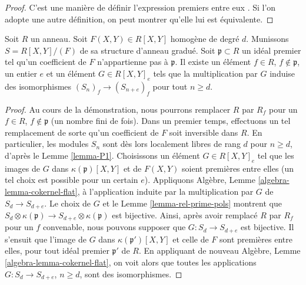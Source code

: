 \begin{proof}
C'est une mani\`ere de d\'efinir l'expression \og premiers entre eux \fg. Si
l'on adopte une autre d\'efinition, on peut montrer qu'elle lui est \'equivalente.
\end{proof}

\begin{lemma}
\label{lemma-P1-localize}
Soit $R$ un anneau. Soit $F(X, Y) \in R[X, Y]$ homog\`ene de degr\'e
$d$. Munissons $S = R[X, Y]/(F)$ de sa structure d'anneau gradu\'e.
Soit $\mathfrak p \subset R$ un id\'eal premier tel qu'un
coefficient de $F$ n'appartienne pas \`a $\mathfrak p$.
Il existe un \'el\'ement $f \in R$, $f \not\in \mathfrak p$,
un entier $e$ et un \'el\'ement $G \in R[X, Y]_e$
tels que la multiplication par $G$ induise des isomorphismes
$(S_n)_f \to (S_{n + e})_f$ pour tout $n \geq d$.
\end{lemma}

\begin{proof}
Au cours de la d\'emonstration, nous pourrons remplacer $R$ par $R_f$
pour un $f\in R$, $f\not\in \mathfrak p$ (un nombre fini de fois).
Dans un premier temps, effectuons un tel remplacement de sorte
qu'un coefficient de $F$ soit inversible dans $R$.
En particulier, les modules $S_n$ sont d\`es lors localement
libres de rang $d$ pour $n \geq d$, d'apr\`es le Lemme \ref{lemma-P1}.
Choisissons un \'el\'ement $G \in R[X, Y]_e$ tel que les images de
$G$ dans $\kappa(\mathfrak p)[X, Y]$ et de
$F(X, Y)$ soient premi\`eres entre elles (un tel choix est possible pour un certain $e$).
Appliquons Alg\`ebre, Lemme \ref{algebra-lemma-cokernel-flat}, \`a l'application
induite par la multiplication par $G$ de $S_d \to S_{d + e}$.
Le choix de $G$ et le Lemme \ref{lemma-rel-prime-pols}
montrent que
$S_d \otimes \kappa(\mathfrak p) \to S_{d + e} \otimes \kappa(\mathfrak p)$
est bijective. Ainsi, apr\`es avoir remplac\'e $R$ par $R_f$ pour un
$f$ convenable, nous pouvons supposer que $G : S_d \to S_{d + e}$
est bijective. Il s'ensuit que l'image
de $G$ dans $\kappa(\mathfrak p')[X, Y]$ et celle de
$F$ sont premi\`eres entre elles, pour tout id\'eal premier $\mathfrak p'$
de $R$. En appliquant de nouveau Alg\`ebre, Lemme
\ref{algebra-lemma-cokernel-flat}, on voit alors que toutes les applications
$G : S_d \to S_{d + e}$, $n \geq d$, sont des isomorphismes.
\end{proof}

